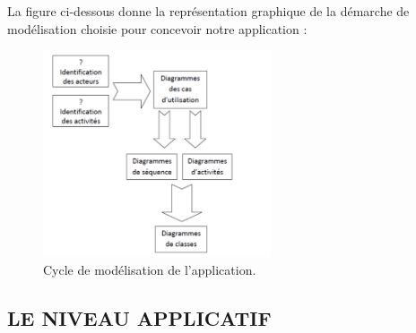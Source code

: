 \documentclass[english,12pt,a4paper]{report}
\begin{document}
\begin{itemize}
	La figure ci-dessous donne la représentation graphique de la démarche de
	modélisation choisie pour concevoir notre application :
	\begin{figure}[h]
		\centering
		\includegraphics[width=0.6\textwidth]{dContext2.png}
		\caption{Cycle de modélisation de l’application.}
		\label{fig2: Cycle de modélisation de l’application.}
	\end{figure}
\end{itemize}
\subsection{LE NIVEAU APPLICATIF}
\end{document}
